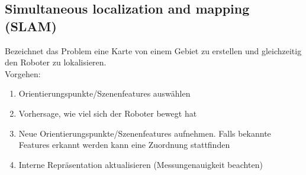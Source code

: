 \subsection{Simultaneous localization and mapping (SLAM)}
Bezeichnet das Problem eine Karte von einem Gebiet zu erstellen und gleichzeitig den Roboter zu lokalisieren.\\
Vorgehen:
\begin{enumerate}
\item Orientierungspunkte/Szenenfeatures auswählen
\item Vorhersage, wie viel sich der Roboter bewegt hat
\item Neue Orientierungspunkte/Szenenfeatures aufnehmen. Falls bekannte Features erkannt werden kann eine Zuordnung stattfinden
\item Interne Repräsentation aktualisieren (Messungenauigkeit beachten)
\end{enumerate}